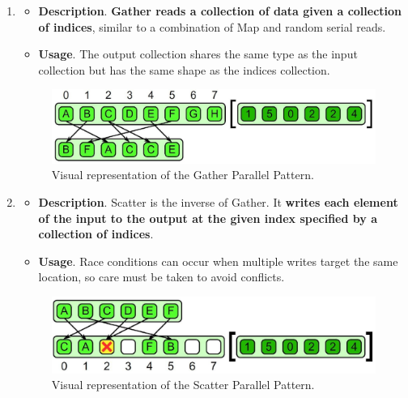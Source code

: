 \begin{enumerate}
    \newpage
    \item {}
    \begin{itemize}
        \item[\textcolor{Red2}{\faIcon{book}}] \textcolor{Red2}{\textbf{Description}}. \textbf{Gather reads a collection of data given a collection of indices}, similar to a combination of Map and random serial reads.

        \item[\textcolor{Green3}{\faIcon{question}}] \textcolor{Green3}{\textbf{Usage}}. The output collection shares the same type as the input collection but has the same shape as the indices collection.
    \end{itemize}
    \begin{figure}[!htp]
        \centering
        \includegraphics[width=\textwidth]{img/gather-pattern-1.pdf}
        \caption{Visual representation of the Gather Parallel Pattern.}
    \end{figure}


    \item {}
    \begin{itemize}
        \item[\textcolor{Red2}{\faIcon{book}}] \textcolor{Red2}{\textbf{Description}}. Scatter is the inverse of Gather. It \textbf{writes each element of the input to the output at the given index specified by a collection of indices}.

        \item[\textcolor{Green3}{\faIcon{question}}] \textcolor{Green3}{\textbf{Usage}}. Race conditions can occur when multiple writes target the same location, so care must be taken to avoid conflicts.
    \end{itemize}
    \begin{figure}[!htp]
        \centering
        \includegraphics[width=\textwidth]{img/scatter-pattern-1.pdf}
        \caption{Visual representation of the Scatter Parallel Pattern.}
    \end{figure}
\end{enumerate}
